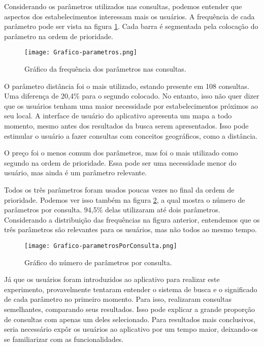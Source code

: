 Considerando os parâmetros utilizados nas consultas, podemos entender que aspectos dos estabelecimentos interessam mais os usuários. A frequência de cada parâmetro pode ser vista na figura \ref{fig:graffreqpar}. Cada barra é segmentada pela colocação do parâmetro na ordem de prioridade.

\begin{figure}[!h]
  \centering
  \texttt{[image: Grafico-parametros.png]} 
  \caption{Gráfico da frequência dos parâmetros nas consultas.}
  \label{fig:graffreqpar}
\end{figure}

O parâmetro distância foi o mais utilizado, estando presente em 108 consultas. Uma diferença de 20,4\% para o segundo colocado. No entanto, isso não quer dizer que os usuários tenham uma maior necessidade por estabelecimentos próximos ao seu local. A interface de usuário do aplicativo apresenta um mapa a todo momento, mesmo antes dos resultados da busca serem apresentados. Isso pode estimular o usuário a fazer consultas com conceitos geográficos, como a distância.

O preço foi o menos comum dos parâmetros, mas foi o mais utilizado como segundo na ordem de prioridade. Essa pode ser uma necessidade menor do usuário, mas ainda é um parâmetro relevante.

Todos os três parâmetros foram usados poucas vezes no final da ordem de prioridade. Podemos ver isso também na figura \ref{fig:grafnumpar}, a qual mostra o número de parâmetros por consulta. 94,5\% delas utilizaram até dois parâmetros. Considerando a distribuição das frequências na figura anterior, entendemos que os três parâmetros são relevantes para os usuários, mas não todos ao mesmo tempo.

\begin{figure}[!h]
  \centering
  \texttt{[image: Grafico-parametrosPorConsulta.png]} 
  \caption{Gráfico do número de parâmetros por consulta.}
  \label{fig:grafnumpar}
\end{figure}

Já que os usuários foram introduzidos ao aplicativo para realizar este experimento, provavelmente tentaram entender o sistema de busca e o significado de cada parâmetro no primeiro momento. Para isso, realizaram consultas semelhantes, comparando seus resultados. Isso pode explicar a grande proporção de consultas com apenas um deles selecionado. Para resultados mais conclusivos, seria necessário expôr os usuários ao aplicativo por um tempo maior, deixando-os se familiarizar com as funcionalidades.

